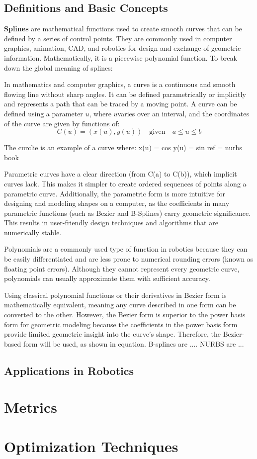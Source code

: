 \subsection{Definitions and Basic Concepts}
\textbf{Splines} are mathematical functions used to create smooth curves that can be defined by a series of 
control points. They are commonly used in computer graphics, animation, CAD, and robotics for 
design and exchange of geometric information. Mathematically, it is a piecewise polynomial function.
To break down the global meaning of splines:

In mathematics and computer graphics, a curve is a continuous and smooth flowing line without sharp angles. 
It can be defined parametrically or implicitly and represents a path that can be traced by a moving point.
A curve can be defined using a parameter 
\(u\), where \(u\)varies over an interval, and the coordinates of the curve are given by functions of:
\begin{equation}
    C(u) = (x(u), y(u)) \quad \text{given} \quad a \leq u \leq b \label{eq:curve}
\end{equation}

The curclie is an example of a curve where:
x(u) = cos
y(u) = sin ref = nurbs book

Parametric curves have a clear direction (from C(a) to C(b)), which implicit curves lack. This makes 
it simpler to create ordered sequences of points along a parametric curve. Additionally, the parametric 
form is more intuitive for designing and modeling shapes on a computer, as the coefficients in many 
parametric functions (such as Bezier and B-Splines) carry geometric significance. This results in 
user-friendly design techniques and algorithms that are numerically stable.

Polynomials are a commonly used type of function in robotics because they can be easily differentiated and are less prone to numerical rounding errors (known as floating point errors). Although they cannot represent every geometric curve, polynomials can usually approximate them with sufficient accuracy.

Using classical polynomial functions or their derivatives in Bezier form is mathematically equivalent, meaning any curve described in one form can be converted to the other. However, the Bezier form is superior to the power basis form for geometric modeling because the coefficients in the power basis form provide limited geometric insight into the curve's shape. Therefore, the Bezier-based form will be used, as shown in equation.
B-splines are ....
NURBS are ...

\subsection{Applications in Robotics}


\section{Metrics}
\section{Optimization Techniques}








